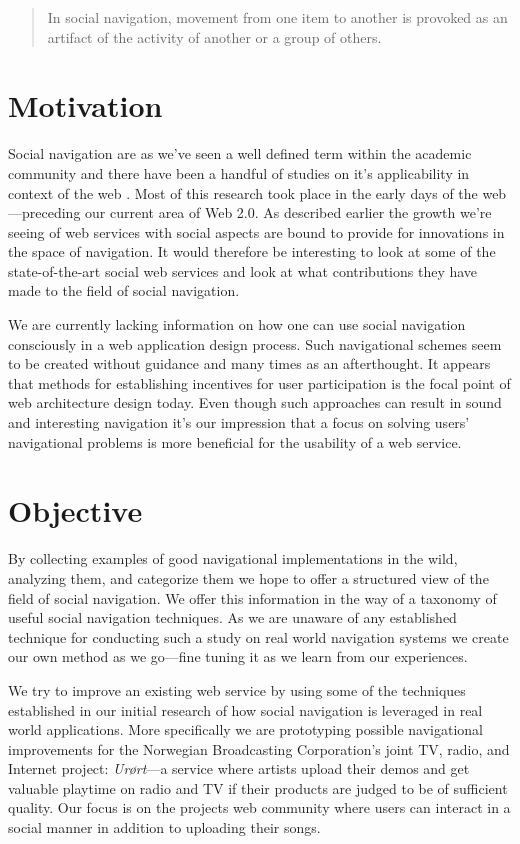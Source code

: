 \begin{quote}
In social navigation, movement from one item to another is provoked as an
artifact of the activity of another or a group of others. \citep{dourish94} 
\end{quote}

\section{Motivation}

Social navigation are as we've seen a well defined term within the academic
community and there have been a handful of studies on it's applicability in
context of the web \citep{dieberger97,wexelblat99}. %
Most of this research took place in the early days of the
web---preceding our current area of Web 2.0. As described earlier the
growth we're seeing of web services with social aspects are bound to provide
for innovations in the space of navigation. It would therefore be interesting
to look at some of the state-of-the-art social web services and look at what
contributions they have made to the field of social navigation.

We are currently lacking information on how one can use social navigation
consciously in a web application design process. Such navigational schemes
seem to be created without guidance and many times as an afterthought.
It appears that methods for establishing incentives for user participation
is the focal point of web architecture design today. Even though such
approaches can result in sound and interesting navigation it's our impression
that a focus on solving users' navigational problems is more beneficial for
the usability of a web service.

\section{Objective}

By collecting examples of good navigational implementations in the wild,
analyzing them, and categorize them we hope to offer a structured view of the
field of social navigation. We offer this information in the way of a taxonomy
of useful social navigation techniques.
As we are unaware of any established technique for
conducting such a study on real world navigation systems we create our own
method as we go---fine tuning it as we learn from our experiences.

We try to improve an existing web service by using some of the techniques
established in our initial research of how social navigation is leveraged
in real world applications. More specifically we are prototyping possible
navigational improvements for the Norwegian Broadcasting Corporation's joint
TV, radio, and Internet project: \emph{Ur\o{}rt}---a service where artists upload
their demos and get valuable playtime on radio and TV if their products are
judged to be of sufficient quality. Our focus is on the projects
web community where users can
interact in a social manner in addition to uploading their songs.

